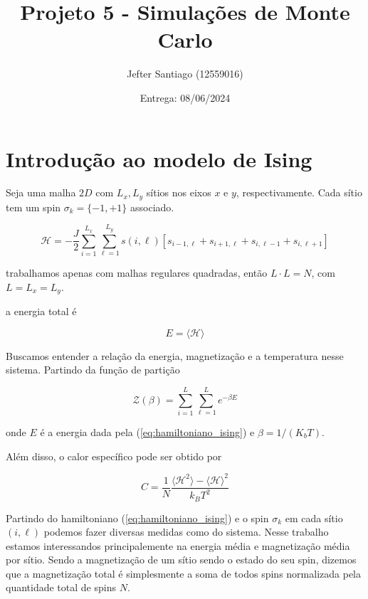 \documentclass{tufte-handout}
\title{Projeto 5 - Simulações de Monte Carlo}
\author{Jefter Santiago (12559016)}
\date{Entrega: 08/06/2024}
\begin{document}
\maketitle
\section{Introdução ao modelo de Ising}

Seja uma malha $2D$ com $L_x, L_y$ sítios nos eixos 
$x$ e $y$, respectivamente. Cada sítio tem um spin $\sigma_k = \{ -1, +1 \}$ associado. 

\begin{equation}
  \mathcal{H} = -\frac{J}{2} \sum_{i = 1}^{L_x}\sum_{\ell = 1}^{L_y} s(i, \ell) \left[s_{i-1,\ell}+s_{i+1, \ell}+s_{i, \ell-1}+s_{i, \ell + 1}\right]
  \label{eq:hamiltoniano_ising}
\end{equation}

trabalhamos apenas com malhas regulares quadradas, então $L \cdot L = N$, com $L=L_x=L_y$. 

a energia total é 

\begin{equation}
    E = \langle \mathcal{H} \rangle
\end{equation}


Buscamos entender a relação da energia, magnetização 
e a temperatura nesse sistema. 
Partindo da função de partição 

\begin{equation}
    \mathcal{Z}(\beta) = \sum_{i = 1}^{L} \sum_{\ell = 1}^{L} e^{-\beta E}
    \label{eq:funcao_particao}
\end{equation} 

onde $E$ é a energia dada pela (\ref{eq:hamiltoniano_ising}) e $\beta = 1/(K_bT)$.

Além disso, o calor específico pode ser obtido por 


\begin{equation}
    C = \frac{1}{N}\frac{\langle \mathcal{H}^2 \rangle - \langle \mathcal{H} \rangle^2}{k_B T^2}
    \label{eq:calor_especifico}
\end{equation}


Partindo do hamiltoniano (\ref{eq:hamiltoniano_ising}) e o spin $\sigma_k$ em cada sítio
$(i, \ell)$ podemos fazer diversas medidas como do sistema. 
Nesse trabalho estamos interessandos principalemente na energia média e magnetização média por sítio. 
Sendo a magnetização de um sítio sendo o estado do seu spin, dizemos que a magnetização 
total é simplesmente a soma de todos spins normalizada pela quantidade total de spins $N$.
\end{document}
